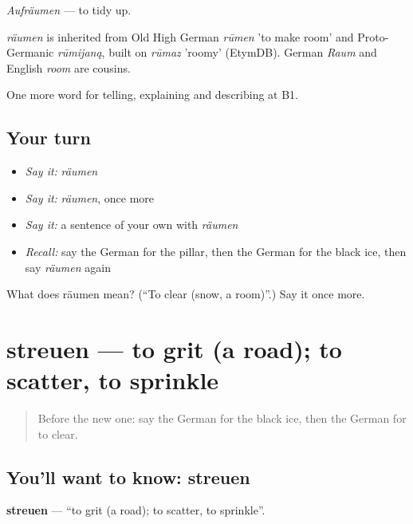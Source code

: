 \emph{Aufräumen} — to tidy up.

\begin{cousinweb}
\emph{räumen} is inherited from Old High German \emph{rūmen} 'to make room' and Proto-Germanic \emph{rūmijaną}, built on \emph{rūmaz} 'roomy' (EtymDB). German \emph{Raum} and English \emph{room} are cousins.
\end{cousinweb}

\begin{grammarlens}[title={What you've built}]
One more word for telling, explaining and describing at B1.
\end{grammarlens}

\subsection*{Your turn}
\begin{itemize}
\raggedright
  \item \emph{Say it:} \emph{räumen}
  \item \emph{Say it:} \emph{räumen}, once more
  \item \emph{Say it:} a sentence of your own with \emph{räumen}
  \item \emph{Recall:} say the German for the pillar, then the German for the black ice, then say \emph{räumen} again
\end{itemize}

\begin{tcolorbox}[breakable,colback=teal!4,colframe=teal!35!black,title={Before you move on}]
What does räumen mean? (\textquotedblleft{}To clear (snow, a room)\textquotedblright{}.) Say it once more.
\end{tcolorbox}
\section[streuen]{streuen — to grit (a road); to scatter, to sprinkle}

\label{lesson:GE-C442-streuen}



\begin{quote}
Before the new one: say the German for the black ice, then the German for to clear.
\end{quote}

\subsection*{You'll want to know: streuen}
\textbf{streuen} — \textquotedblleft{}to grit (a road); to scatter, to sprinkle\textquotedblright{}.


